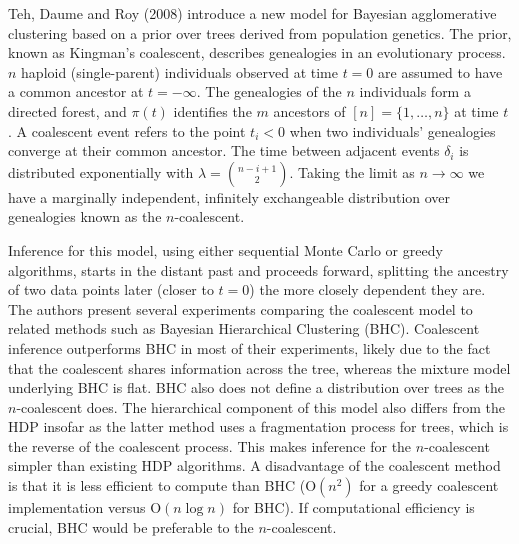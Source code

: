 \documentclass[12pt,letterpaper]{article}
\begin{document}


Teh, Daume and Roy (2008) introduce a new model for Bayesian agglomerative clustering based on a prior over trees derived from population genetics. 
The prior, known as Kingman's coalescent, describes genealogies in an evolutionary process. 
$n$ haploid (single-parent) individuals observed at time $t=0$ are assumed to have a common ancestor at $t=-\infty$. 
The genealogies of the $n$ individuals form a directed forest, and $\pi(t)$ identifies the $m$ ancestors of $[n]=\{1,\ldots,n\}$ at time $t$. 
A coalescent event refers to the point $t_i<0$ when two individuals' genealogies converge at their common ancestor. 
The time between adjacent events $\delta_i$ is distributed exponentially with $\lambda={n-i+1 \choose 2}$. 
Taking the limit as $n \rightarrow \infty$ we have a marginally independent, infinitely exchangeable distribution over genealogies known as the $n$-coalescent. 


Inference for this model, using either sequential Monte Carlo or greedy algorithms, starts in the distant past and proceeds forward, splitting the ancestry of two data points later (closer to $t=0$) the more closely dependent they are. 
The authors present several experiments comparing the coalescent model to related methods such as Bayesian Hierarchical Clustering (BHC). 
Coalescent inference outperforms BHC in most of their experiments, likely due to the fact that the coalescent shares information across the tree, whereas the mixture model underlying BHC is flat.
BHC also does not define a distribution over trees as the $n$-coalescent does. 
The hierarchical component of this model also differs from the HDP insofar as the latter method uses a fragmentation process for trees, which is the reverse of the coalescent process. 
This makes inference for the $n$-coalescent simpler than existing HDP algorithms. 
A disadvantage of the coalescent method is that it is less efficient to compute than BHC (O$(n^2)$ for a greedy coalescent implementation versus O$(n\log n)$ for BHC). 
If computational efficiency is crucial, BHC would be preferable to the $n$-coalescent. 
\end{document}
